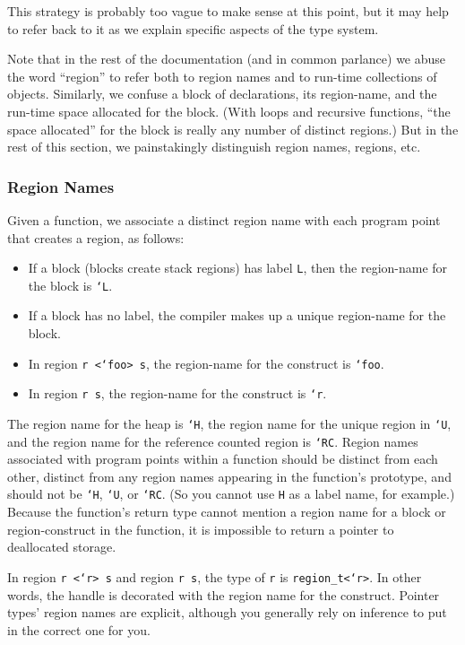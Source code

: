 This strategy is probably too vague to make sense at this point, but
it may help to refer back to it as we explain specific aspects of the
type system.

Note that in the rest of the documentation (and in common parlance) we
abuse the word ``region'' to refer both to region names and to
run-time collections of objects.  Similarly, we confuse a block of
declarations, its region-name, and the run-time space allocated for
the block.  (With loops and recursive functions, ``the space
allocated'' for the block is really any number of distinct regions.)
But in the rest of this section, we painstakingly distinguish
region names, regions, etc.

\subsubsection{Region Names}

Given a function, we associate a distinct region name with each
program point that creates a region, as follows:

\begin{itemize}
\item If a block (blocks create stack regions) has label \texttt{L},
  then the region-name for the block is \texttt{`L}.
\item If a block has no label, the compiler makes up a unique
  region-name for the block.
\item In region \texttt{r <`foo> s}, the region-name for the construct
  is \texttt{`foo}.
\item In region \texttt{r s}, the region-name for the construct is
  \texttt{`r}.
\end{itemize}

The region name for the heap is \texttt{`H}, the region name for the unique
region in \texttt{`U}, and the region name for the reference counted region
is \texttt{`RC}.  Region names associated with program points within a
function should be distinct from each other, distinct from any region names
appearing in the function's prototype, and should not be \texttt{`H},
\texttt{`U}, or \texttt{`RC}.  (So you cannot use \texttt{H} as a label
name, for example.)  Because the function's return type cannot mention a
region name for a block or region-construct in the function, it is
impossible to return a pointer to deallocated storage.

In region \texttt{r <`r> s} and region \texttt{r s}, the type of
\texttt{r} is \texttt{region_t<`r>}.  In other words, the handle is
decorated with the region name for the construct.  Pointer types'
region names are explicit, although you generally rely on inference to
put in the correct one for you.

